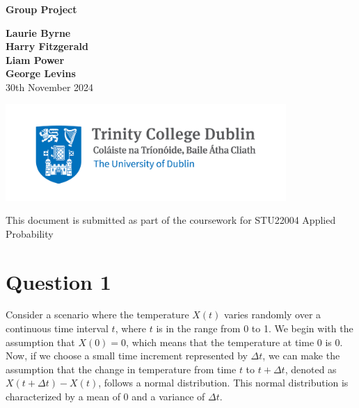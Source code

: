 \documentclass{article}
\begin{document}
\begin{titlepage}
    \begin{center}
        \vspace*{1.5cm}
        
        \Huge
        \textbf{Group Project}
        
        \Large
        \vspace{1.5cm}
        
            \textbf{Laurie Byrne}\\
            \textbf{Harry Fitzgerald}\\
            \textbf{Liam Power}\\
            \textbf{George Levins}\\

        \vspace{1.5cm}
        30th November 2024
        
        \vspace{3cm}
        
        \includegraphics[width=0.8\textwidth]{Trinity_Main_Logo.jpg}

        \vspace{2cm}
        \vfill
        {\large This document is submitted as part of the coursework for STU22004 Applied Probability}
        
    \end{center}    
\end{titlepage}

\newpage
\section*{Question 1}
Consider a scenario where the temperature \(X(t)\) varies randomly over a continuous time interval \(t\), where \(t\) is in the range from 0 to 1. We begin with the assumption that \(X(0)=0\), which means that the temperature at time 0 is 0. Now, if we choose a small time increment represented by \(\Delta t\), we can make the assumption that the change in temperature from time \(t\) to \(t+\Delta t\), denoted as \(X(t+\Delta t)-X(t)\), follows a normal distribution. This normal distribution is characterized by a mean of 0 and a variance of \(\Delta t\).\\
\end{document}
